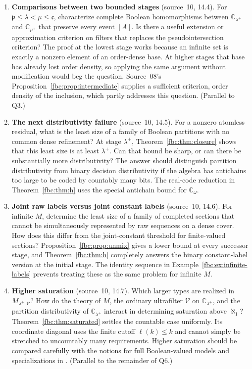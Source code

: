 \documentclass[11pt,letterpaper]{article}
\theoremstyle{definition}
\theoremstyle{remark}
\newcommand{\om}{\omega}
\newcommand{\C}{\mathbb C}
\newcommand{\cp}{\mathfrak p}
\newcommand{\cc}{\mathfrak c}
\newcommand{\cV}{\mathcal V}
\begin{document}
\begin{enumerate}[label=\textbf{R\arabic*.},leftmargin=3em]
\item \textbf{Comparisons between two bounded stages} (source~10, 14.4).
For $\cp\leq\lambda<\mu\leq\cc$, characterize complete Boolean
homomorphisms between $\C_{\lambda^+}$ and $\C_{\mu^+}$ that preserve
every event $[A]$. Is there a useful extension or approximation
criterion on filters that replaces the pseudointersection criterion?
The proof at the lowest stage works because an infinite set is exactly
a nonzero element of an order-dense base. At higher stages that base
has already lost order density, so applying the same argument without
modification would beg the question. Source~08's
Proposition~\ref{fbc:prop:intermediate} supplies a sufficient criterion,
order density of the inclusion, which partly addresses this question.
(Parallel to Q3.)

\item \textbf{The next distributivity failure} (source~10, 14.5). For a
nonzero atomless residual, what is the least size of a family of
Boolean partitions with no common dense refinement? At stage
$\lambda^+$, Theorem~\ref{fbc:thm:closure} shows that this least size is
at least $\lambda^+$. Can that bound be sharp, or can there be
substantially more distributivity? The answer should distinguish
partition distributivity from binary decision distributivity if the
algebra has antichains too large to be coded by countably many bits. The
real-code reduction in Theorem~\ref{fbc:thm:h} uses the special antichain
bound for $\C_\om$.

\item \textbf{Joint raw labels versus joint constant labels}
(source~10, 14.6). For infinite $M$, determine the least size of a
family of completed sections that cannot be simultaneously represented
by raw sequences on a dense cover. How does this differ from the
joint-constant threshold for finite-valued sections?
Proposition~\ref{fbc:prop:unmix} gives a lower bound at every successor
stage, and Theorem~\ref{fbc:thm:h} completely answers the binary
constant-label version at the initial stage. The identity sequence in
Example~\ref{fbc:ex:infinite-labels} prevents treating these as the same
problem for infinite $M$.

\item \textbf{Higher saturation} (source~10, 14.7). Which larger types
are realized in $M_{\lambda^+,\cV}$? How do the theory of $M$, the
ordinary ultrafilter $\cV$ on $\C_{\lambda^+}$, and the partition
distributivity of $\C_{\lambda^+}$ interact in determining saturation
above $\aleph_1$? Theorem~\ref{fbc:thm:saturated} settles the countable
case uniformly. Its coordinate diagonal uses the finite cutoff
$\ell(k)\leq k$ and cannot simply be stretched to uncountably many
requirements. Higher saturation should be compared carefully with the
notions for full Boolean-valued models and specializations in
\cite{Ulrich}. (Parallel to the remainder of Q6.)


\end{enumerate}
\end{document}
